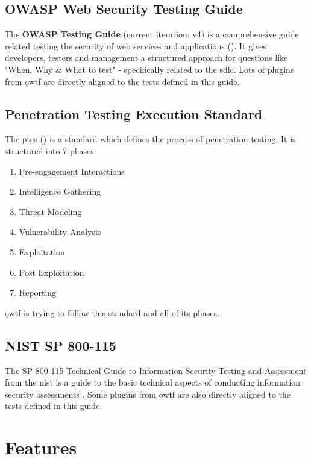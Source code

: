 \subsection{OWASP Web Security Testing Guide}

The \textbf{OWASP Testing Guide} (current iteration: v4) is a comprehensive guide related testing the security of web services and applications (\cite{Guide.11.06.2021}). It gives developers, testers and management a structured approach for questions like "When, Why \& What to test" - specifically related to the \ac{sdlc}. Lots of plugins from \ac{owtf} are directly aligned to the tests defined in this guide.

\subsection{Penetration Testing Execution Standard}

The \ac{ptes} (\cite{PTES.11.06.2021}) is a standard which defines the process of penetration testing. It is structured into 7 phases: 

\begin{enumerate}
 	\item Pre-engagement Interactions
	\item Intelligence Gathering
	\item Threat Modeling
	\item Vulnerability Analysis
	\item Exploitation
	\item Post Exploitation
	\item Reporting
\end{enumerate}

\ac{owtf} is trying to follow this standard and all of its phases.

\subsection{NIST SP 800-115}

The SP 800-115 Technical Guide to Information Security Testing and Assessment from the \ac{nist} is a guide to the basic technical aspects of conducting information security assessments \cite{NIST.29.06.2021}. Some plugins from \ac{owtf} are also directly aligned to the tests defined in this guide.

\section{Features}


